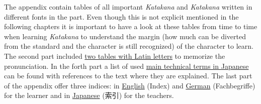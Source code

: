 The appendix contain tables of all important \textit{Katakana} and
\textit{Katakana} written in different fonts in the
 part. Even though this is not explicit mentioned
in the following chapters it is important to have a look at these tables from
time to time when learning \textit{Katakana} to understand the margin (how
much can be diverted from the standard and the character is still recognized)
of the character to learn. The second part included
\hyperref[chap:RomajiTables]{two tables with Latin letters} to memorize the
pronunciation. In the forth part a list of used
\hyperref[chap:ListOfJapaneseTechnicalTerms]{main technical terms in Japanese}
can be found with references to the text where they are explained.  The last
part of the appendix offer three indices: in
\hyperref[chap:EnglishIndex]{English} (Index) and
\hyperref[chap:GermanIndex]{German} (Fachbegriffe) for the learner and in
\hyperref[chap:JapaneseIndex]{Japanese} (索引) for the teachers.




